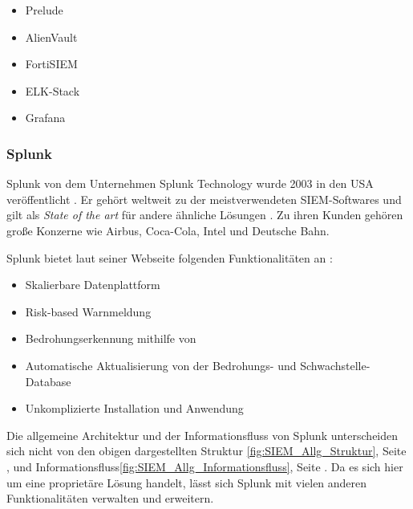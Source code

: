 \begin{itemize}[noitemsep]
   \item Prelude %
   \item AlienVault  %
   \item FortiSIEM %
   \item ELK-Stack %
   \item Grafana %
\end{itemize}


\newpage
\subsubsection{Splunk}
Splunk von dem Unternehmen Splunk Technology wurde 2003 in den USA veröffentlicht \citep{Splunk_splunk}. Er gehört weltweit zu der meistverwendeten \gls{SIEM}-Softwares und gilt als \textit{State of the art} für andere ähnliche Lösungen \citep{Kazarov_Splunk}. Zu ihren Kunden gehören große Konzerne wie Airbus, Coca-Cola, Intel und Deutsche Bahn. 

Splunk bietet laut seiner Webseite folgenden Funktionalitäten an \citep{Splunk_SPE}:

\begin{itemize}[noitemsep]
   \item Skalierbare Datenplattform 
   \item Risk-based Warnmeldung  
   \item Bedrohungserkennung mithilfe von  
   \item Automatische Aktualisierung von der Bedrohungs- und Schwachstelle-Database 
   \item Unkomplizierte Installation und Anwendung 
\end{itemize}

Die allgemeine Architektur und der Informationsfluss von Splunk unterscheiden sich nicht von den obigen dargestellten Struktur \ref{fig:SIEM_Allg_Struktur}, Seite \pageref{fig:SIEM_Allg_Struktur}, und Informationsfluss\ref{fig:SIEM_Allg_Informationsfluss}, Seite \pageref{fig:SIEM_Allg_Informationsfluss}. Da es sich hier um eine proprietäre Lösung handelt, lässt sich Splunk mit vielen anderen Funktionalitäten verwalten und erweitern. 


